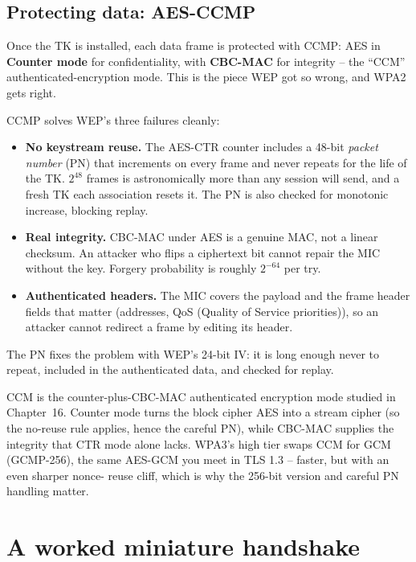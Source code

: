 \subsection{Protecting data: AES-CCMP}

Once the TK is installed, each data frame is protected with CCMP: AES in
\textbf{Counter mode} for confidentiality, with \textbf{CBC-MAC} for integrity --
the ``CCM'' authenticated-encryption mode. This is the piece WEP got so wrong, and
WPA2 gets right.

\begin{whybox}
CCMP solves WEP's three failures cleanly:
\begin{itemize}
  \item \textbf{No keystream reuse.} The AES-CTR counter includes a 48-bit
        \emph{packet number} (PN) that increments on every frame and never
        repeats for the life of the TK. $2^{48}$ frames is astronomically more
        than any session will send, and a fresh TK each association resets it. The
        PN is also checked for monotonic increase, blocking replay.
  \item \textbf{Real integrity.} CBC-MAC under AES is a genuine MAC, not a linear
        checksum. An attacker who flips a ciphertext bit cannot repair the MIC
        without the key. Forgery probability is roughly $2^{-64}$ per try.
  \item \textbf{Authenticated headers.} The MIC covers the payload and the frame header fields that matter (addresses, QoS (Quality of Service priorities)), so an attacker
        cannot redirect a frame by editing its header.
\end{itemize}
The PN fixes the problem with WEP's 24-bit IV: it is long enough never to
repeat, included in the authenticated data, and checked for replay.
\end{whybox}

\begin{connectionbox}
CCM is the counter-plus-CBC-MAC authenticated encryption mode studied in
Chapter~16. Counter mode turns the block cipher AES into a stream cipher (so
the no-reuse rule applies, hence the careful PN), while CBC-MAC supplies the
integrity that CTR mode alone lacks. WPA3's high tier swaps CCM for GCM (GCMP-256),
the same AES-GCM you meet in TLS 1.3 -- faster, but with an even sharper nonce-
reuse cliff, which is why the 256-bit version and careful PN handling matter.
\end{connectionbox}

\section{A worked miniature handshake}

